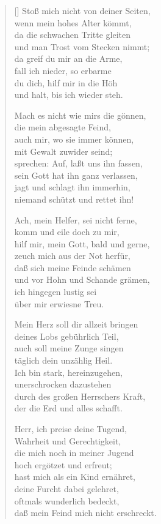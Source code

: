 \begin{multicols}{2}
\begin{verse}[\versewidth]
 Stoß mich nicht von deiner Seiten,\\
wenn mein hohes Alter kömmt,\\
da die schwachen Tritte gleiten\\
und man Trost vom Stecken nimmt;\\
da greif du mir an die Arme,\\
fall ich nieder, so erbarme\\
du dich, hilf mir in die Höh\\
und halt, bis ich wieder steh.

 Mach es nicht wie mirs die gönnen,\\
die mein abgesagte Feind,\\
auch mir, wo sie immer können,\\
mit Gewalt zuwider seind;\\
sprechen: Auf, laßt uns ihn fassen,\\
sein Gott hat ihn ganz verlassen,\\
jagt und schlagt ihn immerhin,\\
niemand schützt und rettet ihn!

 Ach, mein Helfer, sei nicht ferne,\\
komm und eile doch zu mir,\\
hilf mir, mein Gott, bald und gerne,\\
zeuch mich aus der Not herfür,\\
daß sich meine Feinde schämen\\
und vor Hohn und Schande grämen,\\
ich hingegen lustig sei\\
über mir erwiesne Treu.

 Mein Herz soll dir allzeit bringen\\
deines Lobs gebührlich Teil,\\
auch soll meine Zunge singen\\
täglich dein unzählig Heil.\\
Ich bin stark, hereinzugehen,\\
unerschrocken dazustehen\\
durch des großen Herrschers Kraft,\\
der die Erd und alles schafft.

 Herr, ich preise deine Tugend,\\
Wahrheit und Gerechtigkeit,\\
die mich noch in meiner Jugend\\
hoch ergötzet und erfreut;\\
hast mich als ein Kind ernähret,\\
deine Furcht dabei gelehret,\\
oftmals wunderlich bedeckt,\\
daß mein Feind mich nicht erschreckt.


\end{verse}
\end{multicols}
